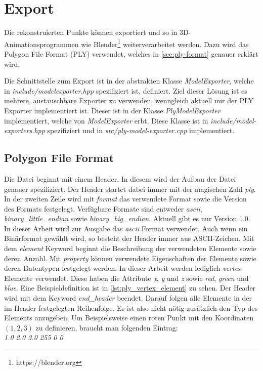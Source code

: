 \section{Export}
Die rekonstruierten Punkte können exportiert und so in 3D-Animationsprogrammen wie Blender\footnote{https://blender.org} weiterverarbeitet werden.
Dazu wird das Polygon File Format (PLY) verwendet, welches in \autoref{sec:ply-format} genauer erklärt wird.

Die Schnittstelle zum Export ist in der abstrakten Klasse \emph{ModelExporter}, welche in \emph{include/modelexporter.hpp} spezifiziert ist, definiert.
Ziel dieser Lösung ist es mehrere, austauschbare Exporter zu verwenden, wenngleich aktuell nur der PLY Exporter implementiert ist.
Dieser ist in der Klasse \emph{PlyModelExporter} implementiert, welche von \emph{ModelExporter} erbt.
Diese Klasse ist in \emph{include/model-exporters.hpp} spezifiziert und in \emph{src/ply-model-exporter.cpp} implementiert.


\subsection{Polygon File Format}\label{sec:ply-format}
Die Datei beginnt mit einem Header.
In diesem wird der Aufbau der Datei genauer spezifiziert.
Der Header startet dabei immer mit der magischen Zahl \emph{ply}.
In der zweiten Zeile wird mit \emph{format} das verwendete Format sowie die Version des Formats festgelegt.
Verfügbare Formate sind entweder \emph{ascii}, \emph{binary\_little\_endian} sowie \emph{binary\_big\_endian}.
Aktuell gibt es nur Version 1.0.
In dieser Arbeit wird zur Ausgabe das \emph{ascii} Format verwendet.
Auch wenn ein Binärformat gewählt wird, so besteht der Header immer aus ASCII-Zeichen.
Mit dem \emph{element} Keyword beginnt die Beschreibung der verwendeten Elemente sowie deren Anzahl.
Mit \emph{property} können verwendete Eigenschaften der Elemente sowie deren Datentypen festgelegt werden.
In dieser Arbeit werden lediglich \emph{vertex} Elemente verwendet.
Diese haben die Attribute \emph{x}, \emph{y} und \emph{z} sowie \emph{red}, \emph{green} und \emph{blue}.
Eine Beispieldefinition ist in \autoref{lst:ply_vertex_element} zu sehen.
Der Header wird mit dem Keyword \emph{end\_header} beendet.
Darauf folgen alle Elemente in der im Header festgelegten Reihenfolge.
Es ist also nicht nötig zusätzlich den Typ des Elements anzugeben.
Um Beispielsweise einen roten Punkt mit den Koordinaten $\left(1, 2, 3\right)$ zu definieren, braucht man folgenden Eintrag:\\
\emph{1.0	2.0	3.0	255	0	0}

